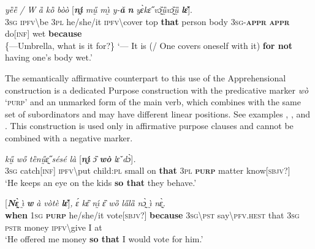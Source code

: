 \documentclass[output=paper,colorlinks,citecolor=brown
]{langscibook}
\begin{document}
\ea \label{ex:Fed62}
\gll \textit{{\E}} \textit{yȅȅ} \textit{/} \textit{W} \textit{ȁ} \textit{kȍ} \textit{bòò} \textup{[}\textit{\textbf{nı̰́}} \textit{mṵ̋} \textit{mı̰̀} \textit{y-\textbf{ǎ}} \textit{\textbf{n{\ù}}} \textit{yɛ̀kɛ̋} \textit{vɔ̰̏ṵ̏vɔ̰̏ṵ̏} \textit{\textbf{lɛ̌}}\textup{]}. \\
\textsc{3sg} \textsc{ipfv\backslash}be {} \textsc{3pl} he/she/it \textsc{ipfv\backslash}cover top \textbf{that} person body \textsc{3sg-\textbf{appr}} \textbf{\textsc{appr}} do[\textsc{inf}] wet \textbf{because} \\
\glt \{---Umbrella, what is it for?\} `--- It is (/ One covers oneself with it) \textbf{for not} having one's body wet.'
\z


The semantically affirmative counterpart to this use of the Apprehensional construction is a dedicated Purpose construction with the  predicative marker \textit{wò} `\textsc{purp}' and an unmarked  form of the main verb, which combines with the same set of subordinators and may have different linear positions. See examples , , and . This construction is used only in affirmative purpose clauses and cannot be combined with a negative marker.

\ea \label{ex:Fed63}
\gll \textit{{\E}} \textit{kṵ̋} \textit{wő} \textit{tȅnṵ̋ɛ̰̋} \textit{sésé} \textit{là} \textup{[}\textit{\textbf{nı̰́}} \textit{ɔ̏} \textit{\textbf{wò}} \textit{lɛ̌} \textit{dɔ̀}\textup{]}\textit{.} \\
\textsc{3sg} catch[\textsc{inf}] \textsc{ipfv\backslash}put child:\textsc{pl} small on \textbf{that} \textsc{3pl} \textsc{\textbf{purp}} matter know[\textsc{sbjv?}]\footnotemark \\
\glt `He keeps an eye on the kids \textbf{so that} they behave.'
\z


\ea \label{ex:Fed64}
\gll \textup{[}\textit{\textbf{Nɛ̰̀}} \textit{ı̰̀} \textit{\textbf{w}} \textit{à} \textit{vòtè} \textit{\textbf{lɛ̌}}\textup{]}\textit{,} \textit{ɛ́} \textit{kɛ̏} \textit{nı̰́} \textit{ɛ̏} \textit{wȍ} \textit{la̋lȁ} \textit{nɔ̰̀} \textit{ı̰̀} \textit{nɛ̰̀.} \\
\textbf{when} \textsc{1sg} \textsc{\textbf{purp}} he/she/it vote[\textsc{sbjv?}] \textbf{because} \textsc{3sg\backslash pst} say\backslash\textsc{pfv.hest} that \textsc{3sg} \textsc{pstr} money \textsc{ipfv\backslash}give I at \\
\glt `He offered me money \textbf{so that} I would vote for him.'
\z
\end{document}
